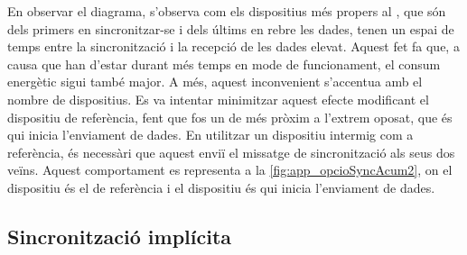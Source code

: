 \documentclass{tfgitic}[2024/07/01]
\begin{document}
{En observar el diagrama, s'observa com els dispositius més propers al , que són dels primers en sincronitzar-se i dels últims en rebre les dades, tenen un espai de temps entre la sincronització i la recepció de les dades elevat. Aquest fet fa que, a causa que han d'estar durant més temps en mode de funcionament, el consum energètic sigui també major. A més, aquest inconvenient s'accentua amb el nombre de dispositius. Es va intentar minimitzar aquest efecte modificant el dispositiu de referència, fent que fos un de més pròxim a l'extrem oposat, que és qui inicia l'enviament de dades. En utilitzar un dispositiu intermig com a referència, és necessàri que aquest enviï el missatge de sincronització als seus dos veïns. Aquest comportament es representa a la \autoref{fig:app_opcioSyncAcum2}, on el dispositiu  és el de referència i el dispositiu  és qui inicia l'enviament de dades. 




\subsection{Sincronització implícita}


}
\end{document}
